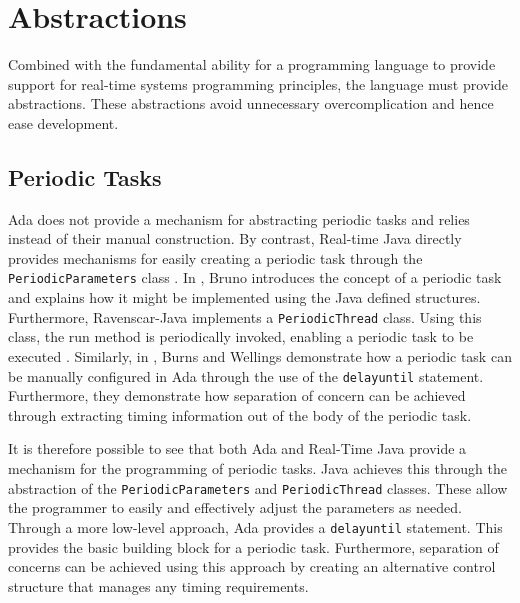 \section{Abstractions}

Combined with the fundamental ability for a programming language to provide
support for real-time systems programming principles, the language must provide
abstractions. These abstractions avoid unnecessary
overcomplication and hence ease development.

\subsection{Periodic Tasks} Ada does not provide a mechanism for
abstracting periodic tasks and relies instead of their manual construction. 
By contrast, Real-time Java directly provides mechanisms for easily creating a periodic task
through the \texttt{PeriodicParameters} class \cite{real-time-systems}. In
\cite{periodic-java-thread}, Bruno introduces the concept of a periodic task
and explains how it might be implemented using the Java defined structures.
Furthermore, Ravenscar-Java implements a \texttt{PeriodicThread} class. Using
this class, the run method is periodically invoked, enabling a periodic task to
be executed \cite{ravenscar-java}.  Similarly, in \cite{burns1998concurrency},
Burns and Wellings demonstrate how a periodic task can be manually configured in
Ada through the use of the \texttt{delay\textunderscore{}until} statement.
Furthermore, they demonstrate how separation of concern can be achieved through
extracting timing information out of the body of the periodic task.
\par\bigskip\noindent
It is therefore possible to see that both Ada and
Real-Time Java provide a mechanism for the programming of periodic tasks. Java
achieves this through the abstraction of the \texttt{PeriodicParameters} and
\texttt{PeriodicThread} classes.  These allow the programmer to easily and
effectively adjust the parameters as needed.  Through a more low-level
approach, Ada provides a \texttt{delay\textunderscore{}until}
statement. This provides the basic building block for a periodic task.
Furthermore, separation of concerns can be achieved using this approach by
creating an alternative control structure that manages any timing requirements.

